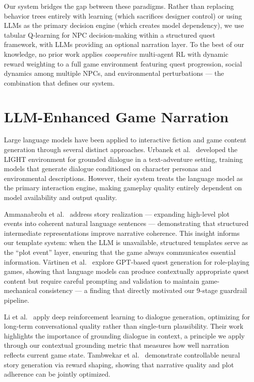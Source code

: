 \documentclass[12pt, a4paper, oneside]{report}
\begin{document}
Our system bridges the gap between these paradigms. Rather than replacing behavior trees entirely with learning (which sacrifices designer control) or using LLMs as the primary decision engine (which creates model dependency), we use tabular Q-learning for NPC decision-making within a structured quest framework, with LLMs providing an optional narration layer. To the best of our knowledge, no prior work applies \textit{cooperative} multi-agent RL with dynamic reward weighting to a full game environment featuring quest progression, social dynamics among multiple NPCs, and environmental perturbations --- the combination that defines our system.

\section{LLM-Enhanced Game Narration}
\label{sec:llm-narration}

Large language models have been applied to interactive fiction and game content generation through several distinct approaches. Urbanek et al.~\cite{urbanek2019light} developed the LIGHT environment for grounded dialogue in a text-adventure setting, training models that generate dialogue conditioned on character personas and environmental descriptions. However, their system treats the language model as the primary interaction engine, making gameplay quality entirely dependent on model availability and output quality.

Ammanabrolu et al.~\cite{ammanabrolu2020story} address story realization --- expanding high-level plot events into coherent natural language sentences --- demonstrating that structured intermediate representations improve narrative coherence. This insight informs our template system: when the LLM is unavailable, structured templates serve as the ``plot event'' layer, ensuring that the game always communicates essential information. V\"{a}rtinen et al.~\cite{vartinen2022quests} explore GPT-based quest generation for role-playing games, showing that language models can produce contextually appropriate quest content but require careful prompting and validation to maintain game-mechanical consistency --- a finding that directly motivated our 9-stage guardrail pipeline.

Li et al.~\cite{li2016dialogue} apply deep reinforcement learning to dialogue generation, optimizing for long-term conversational quality rather than single-turn plausibility. Their work highlights the importance of grounding dialogue in context, a principle we apply through our contextual grounding metric that measures how well narration reflects current game state. Tambwekar et al.~\cite{tambwekar2019controllable} demonstrate controllable neural story generation via reward shaping, showing that narrative quality and plot adherence can be jointly optimized.
\end{document}
